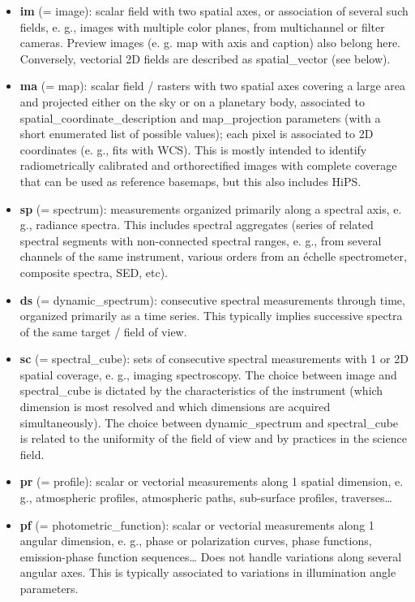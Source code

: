 \documentclass[11pt,a4paper]{ivoa}
\begin{document}
\begin{itemize}
\item \textbf{im }(= image): scalar field with two spatial axes, or association of several such fields, e. g., images with multiple color planes, from multichannel or filter cameras. Preview images (e. g. map with axis and caption) also belong here. Conversely, vectorial 2D fields are described as spatial\_vector (see below).
\item \textbf{ma }(= map): scalar field / rasters with two spatial axes covering a large area and projected either on the sky or on a planetary body, associated to spatial\_coordinate\_description and map\_projection parameters (with a short enumerated list of possible values); each pixel is associated to 2D coordinates (e. g., fits with WCS). This is mostly intended to identify radiometrically calibrated and orthorectified images with complete coverage that can be used as reference basemaps, but this also includes HiPS.
\item \textbf{sp }(= spectrum): measurements organized primarily along a spectral axis, e. g., radiance spectra. This includes spectral aggregates (series of related spectral segments with non-connected spectral ranges, e. g., from several channels of the same instrument, various orders from an échelle spectrometer, composite spectra, SED, etc).
\item \textbf{ds }(= dynamic\_spectrum): consecutive spectral measurements through time, organized primarily as a time series. This typically implies successive spectra of the same target / field of view.
\item \textbf{sc }(= spectral\_cube): sets of consecutive spectral measurements with 1 or 2D spatial coverage, e. g., imaging spectroscopy. The choice between image and spectral\_cube is dictated by the characteristics of the instrument (which dimension is most resolved and which dimensions are acquired simultaneously). The choice between dynamic\_spectrum and spectral\_cube is related to the uniformity of the field of view and by practices in the science field.
\item \textbf{pr }(= profile): scalar or vectorial measurements along 1 spatial dimension, e. g., atmospheric profiles, atmospheric paths, sub-surface profiles, traverses…
\item \textbf{pf }(= photometric\_function): scalar or vectorial measurements along 1 angular dimension, e. g., phase or polarization curves, phase functions, emission-phase function sequences… Does not handle variations along several angular axes. This is typically associated to variations in illumination angle parameters.

\end{itemize}
\end{document}
